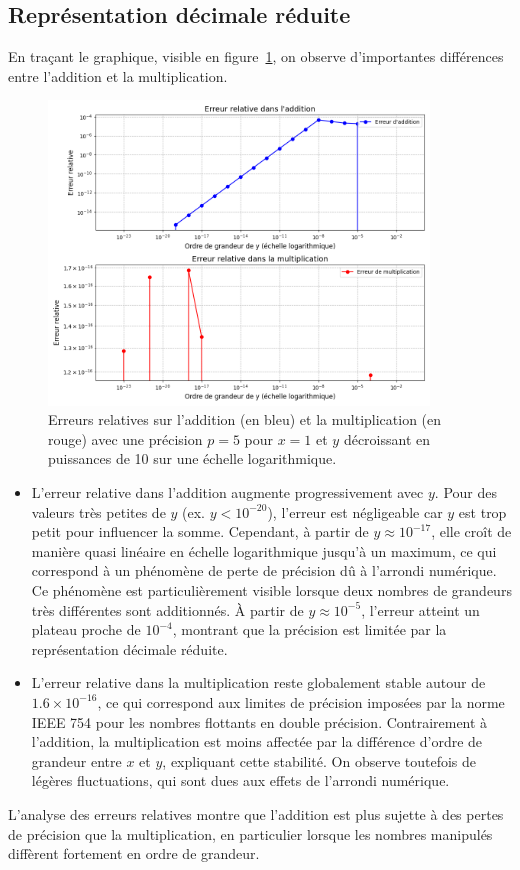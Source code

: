 \documentclass{article}
\begin{document}
\subsection{Représentation décimale réduite}
\noindent En traçant le graphique, visible en figure~\ref{fig:relative_error}, on observe d'importantes différences entre l'addition et la multiplication.
\begin{figure}[h]
  \centering
  \includegraphics[width=0.9\textwidth]{img/relativ_error.png}
\caption{Erreurs relatives sur l'addition (en bleu) et la multiplication (en rouge) avec une précision $p = 5$ pour $x = 1$ et $y$ décroissant en puissances de 10 sur une échelle logarithmique.}
  \label{fig:relative_error}
\end{figure}
\begin{itemize}
    \item L'erreur relative dans l'addition augmente progressivement avec $y$. Pour des valeurs très petites de $y$ (ex. $y < 10^{-20}$), l'erreur est négligeable car $y$ est trop petit pour influencer la somme. Cependant, à partir de $y \approx 10^{-17}$, elle croît de manière quasi linéaire en échelle logarithmique jusqu’à un maximum, ce qui correspond à un phénomène de perte de précision dû à l’arrondi numérique. Ce phénomène est particulièrement visible lorsque deux nombres de grandeurs très différentes sont additionnés. À partir de $y \approx 10^{-5}$, l'erreur atteint un plateau proche de $10^{-4}$, montrant que la précision est limitée par la représentation décimale réduite.
    
    \item L'erreur relative dans la multiplication reste globalement stable autour de $1.6 \times 10^{-16}$, ce qui correspond aux limites de précision imposées par la norme IEEE 754 pour les nombres flottants en double précision. Contrairement à l'addition, la multiplication est moins affectée par la différence d’ordre de grandeur entre $x$ et $y$, expliquant cette stabilité. On observe toutefois de légères fluctuations, qui sont dues aux effets de l’arrondi numérique.

\end{itemize}
L'analyse des erreurs relatives montre que l'addition est plus sujette à des pertes de précision que la multiplication, en particulier lorsque les nombres manipulés diffèrent fortement en ordre de grandeur.
\end{document}
